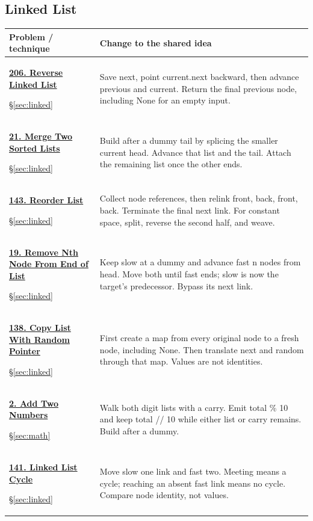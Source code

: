 \documentclass[11pt]{article}
\newcommand{\sect}[1]{\hyperref[sec:#1]{\S\ref*{sec:#1}}}
\begin{document}
\subsection{Linked List}
\begin{longtable}{@{}L{4.3cm}L{11.7cm}@{}}
\toprule Problem / technique & Change to the shared idea \\ \midrule\endhead
\hypertarget{lc206}{}\href{https://leetcode.com/problems/reverse-linked-list/}{\textbf{206. Reverse Linked List}}\par\sect{linked} & Save next, point current.next backward, then advance previous and current. Return the final previous node, including None for an empty input.\\[4pt]
\hypertarget{lc21}{}\href{https://leetcode.com/problems/merge-two-sorted-lists/}{\textbf{21. Merge Two Sorted Lists}}\par\sect{linked} & Build after a dummy tail by splicing the smaller current head. Advance that list and the tail. Attach the remaining list once the other ends.\\[4pt]
\hypertarget{lc143}{}\href{https://leetcode.com/problems/reorder-list/}{\textbf{143. Reorder List}}\par\sect{linked} & Collect node references, then relink front, back, front, back. Terminate the final next link. For constant space, split, reverse the second half, and weave.\\[4pt]
\hypertarget{lc19}{}\href{https://leetcode.com/problems/remove-nth-node-from-end-of-list/}{\textbf{19. Remove Nth Node From End of List}}\par\sect{linked} & Keep slow at a dummy and advance fast n nodes from head. Move both until fast ends; slow is now the target's predecessor. Bypass its next link.\\[4pt]
\hypertarget{lc138}{}\href{https://leetcode.com/problems/copy-list-with-random-pointer/}{\textbf{138. Copy List With Random Pointer}}\par\sect{linked} & First create a map from every original node to a fresh node, including None. Then translate next and random through that map. Values are not identities.\\[4pt]
\hypertarget{lc2}{}\href{https://leetcode.com/problems/add-two-numbers/}{\textbf{2. Add Two Numbers}}\par\sect{math} & Walk both digit lists with a carry. Emit total \% 10 and keep total // 10 while either list or carry remains. Build after a dummy.\\[4pt]
\hypertarget{lc141}{}\href{https://leetcode.com/problems/linked-list-cycle/}{\textbf{141. Linked List Cycle}}\par\sect{linked} & Move slow one link and fast two. Meeting means a cycle; reaching an absent fast link means no cycle. Compare node identity, not values.\\[4pt]

\end{longtable}
\end{document}

